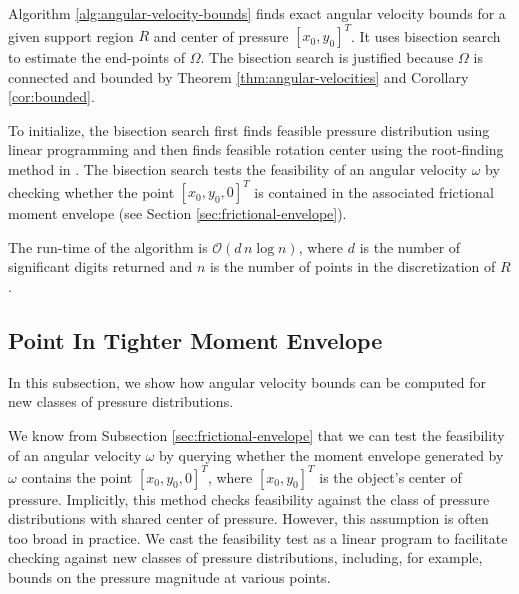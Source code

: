 \documentclass[conference]{IEEEtran}
\begin{document}
Algorithm \ref{alg:angular-velocity-bounds} finds exact angular
velocity bounds for a given support region $R$ and center of pressure
$[x_0,y_0]^T$. It uses bisection search to estimate the end-points of
$\Omega$. The bisection search is justified because $\Omega$ is
connected and bounded by Theorem \ref{thm:angular-velocities} and Corollary
\ref{cor:bounded}.

To initialize, the bisection search first finds feasible
pressure distribution using linear programming and then finds feasible
rotation center using the root-finding method in \cite{Mason1982}. The
bisection search tests the feasibility of an angular velocity $\omega$
by checking whether the point $[x_0,y_0,0]^T$ is contained in the
associated frictional moment envelope (see Section
\ref{sec:frictional-envelope}). 


The run-time of the algorithm is $\mathcal{O}(d\,n\log{} n)$, where
$d$ is the number of significant digits returned and $n$ is the number
of points in the discretization of $R$.

\subsection{Point In Tighter Moment
  Envelope}\label{sec:point-in-moment-enve}

In this subsection, we show how angular velocity bounds can be
computed for new classes of pressure distributions. 

We know from Subsection \ref{sec:frictional-envelope} that we can test
the feasibility of an angular velocity $\omega$ by querying whether
the moment envelope generated by $\omega$ contains the point
$[x_0,y_0,0]^T$, where $[x_0,y_0]^T$ is the object's center of
pressure. Implicitly, this method checks feasibility against the class
of pressure distributions with shared center of pressure. However,
this assumption is often too broad in practice. We cast the
feasibility test as a linear program to facilitate checking against
new classes of pressure distributions, including, for example, bounds
on the pressure magnitude at various points.
\end{document}
